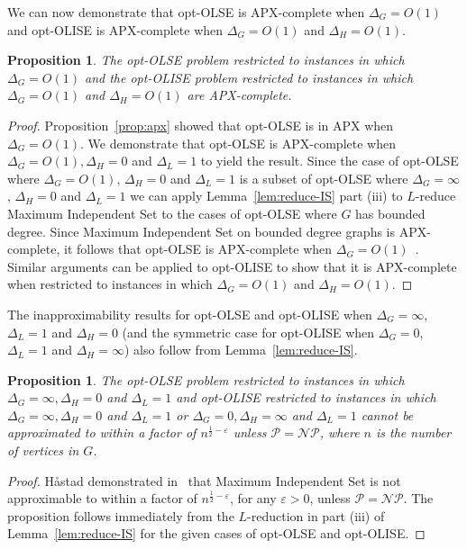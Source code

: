 \documentclass[11pt]{article}
\newtheorem{proposition}[theorem]{Proposition}
\newcommand{\Pol}{\mbox{$\mathcal P$}}
\newcommand{\NP}{\mbox{$\mathcal{NP}$}}
\let\epsilon=\varepsilon
\begin{document}
We can now demonstrate that opt-OLSE is APX-complete when $\Delta_G=O(1)$ and opt-OLISE is APX-complete when $\Delta_G=O(1)$ and $\Delta_H=O(1)$.

\begin{proposition}\label{prop:apx-complete}
The opt-OLSE problem restricted to instances in which $\Delta_G=O(1)$ and the opt-OLISE problem restricted to instances in which $\Delta_G=O(1)$ and $\Delta_H=O(1)$ are APX-complete.
\end{proposition}

\begin{proof}
Proposition~\ref{prop:apx} showed that opt-OLSE is in APX when $\Delta_G=O(1)$. We demonstrate that opt-OLSE is APX-complete when $\Delta_G=O(1), \Delta_H=0$ and $\Delta_L=1$ to yield the result. Since the case of opt-OLSE where $\Delta_G=O(1)$, $\Delta_H=0$ and $\Delta_L=1$ is a subset of opt-OLSE where $\Delta_G=\infty$, $\Delta_H=0$ and $\Delta_L=1$ we can apply Lemma~\ref{lem:reduce-IS} part (iii) to $L$-reduce {\sc Maximum Independent Set} to the cases of opt-OLSE where $G$ has bounded degree.  Since {\sc Maximum Independent Set} on bounded degree graphs is APX-complete, it follows that opt-OLSE is APX-complete when $\Delta_G=O(1)$~\cite{py91}.  Similar arguments can be applied to opt-OLISE to show that it is APX-complete when restricted to instances in which $\Delta_G=O(1)$ and $\Delta_H=O(1)$.
\end{proof}

The inapproximability results for opt-OLSE and opt-OLISE when $\Delta_G = \infty$, $\Delta_L=1$ and $\Delta_H = 0$ (and the symmetric case for opt-OLISE when  $\Delta_G = 0$, $\Delta_L=1$ and $\Delta_H =\infty$) also follow from Lemma~\ref{lem:reduce-IS}.

\begin{proposition}\label{prop:no-apx}
The opt-OLSE problem restricted to instances in which $\Delta_G=\infty, \Delta_H=0$ and $\Delta_L=1$ and opt-OLISE restricted to instances in which $\Delta_G=\infty, \Delta_H=0$ and $\Delta_L=1$ or $\Delta_G=0, \Delta_H=\infty$ and $\Delta_L=1$ cannot be approximated to within a factor of $n^{\frac{1}{2}-\epsilon}$ unless $\Pol = \NP$, where $n$ is the number of vertices in $G$.
\end{proposition}

\begin{proof}
H\r{a}stad demonstrated in~\cite{hastad97} that {\sc Maximum Independent Set} is not approximable to within a factor of $n^{\frac{1}{2}-\epsilon}$, for any $\epsilon > 0$, unless $\Pol = \NP$.  The proposition follows immediately from the $L$-reduction in part (iii) of Lemma~\ref{lem:reduce-IS} for the given cases of opt-OLSE and opt-OLISE.
\end{proof}
\end{document}
